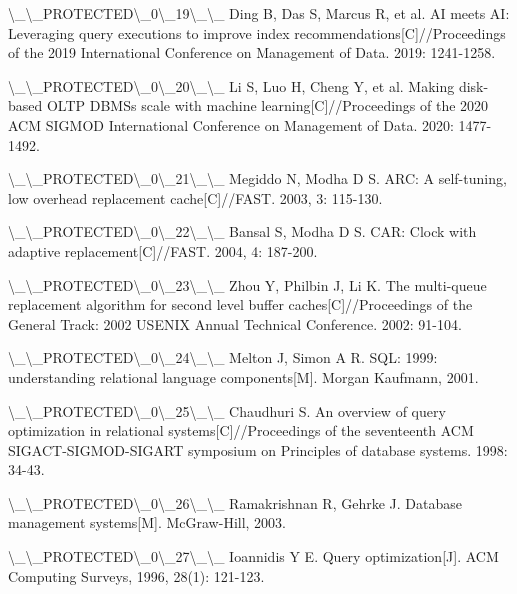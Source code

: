 \textbackslash{}_\textbackslash{}_PROTECTED\textbackslash{}_0\textbackslash{}_19\textbackslash{}_\textbackslash{}_ Ding B, Das S, Marcus R, et al. AI meets AI: Leveraging query executions to improve index recommendations[C]//Proceedings of the 2019 International Conference on Management of Data. 2019: 1241-1258.

\textbackslash{}_\textbackslash{}_PROTECTED\textbackslash{}_0\textbackslash{}_20\textbackslash{}_\textbackslash{}_ Li S, Luo H, Cheng Y, et al. Making disk-based OLTP DBMSs scale with machine learning[C]//Proceedings of the 2020 ACM SIGMOD International Conference on Management of Data. 2020: 1477-1492.

\textbackslash{}_\textbackslash{}_PROTECTED\textbackslash{}_0\textbackslash{}_21\textbackslash{}_\textbackslash{}_ Megiddo N, Modha D S. ARC: A self-tuning, low overhead replacement cache[C]//FAST. 2003, 3: 115-130.

\textbackslash{}_\textbackslash{}_PROTECTED\textbackslash{}_0\textbackslash{}_22\textbackslash{}_\textbackslash{}_ Bansal S, Modha D S. CAR: Clock with adaptive replacement[C]//FAST. 2004, 4: 187-200.

\textbackslash{}_\textbackslash{}_PROTECTED\textbackslash{}_0\textbackslash{}_23\textbackslash{}_\textbackslash{}_ Zhou Y, Philbin J, Li K. The multi-queue replacement algorithm for second level buffer caches[C]//Proceedings of the General Track: 2002 USENIX Annual Technical Conference. 2002: 91-104.

\textbackslash{}_\textbackslash{}_PROTECTED\textbackslash{}_0\textbackslash{}_24\textbackslash{}_\textbackslash{}_ Melton J, Simon A R. SQL: 1999: understanding relational language components[M]. Morgan Kaufmann, 2001.

\textbackslash{}_\textbackslash{}_PROTECTED\textbackslash{}_0\textbackslash{}_25\textbackslash{}_\textbackslash{}_ Chaudhuri S. An overview of query optimization in relational systems[C]//Proceedings of the seventeenth ACM SIGACT-SIGMOD-SIGART symposium on Principles of database systems. 1998: 34-43.

\textbackslash{}_\textbackslash{}_PROTECTED\textbackslash{}_0\textbackslash{}_26\textbackslash{}_\textbackslash{}_ Ramakrishnan R, Gehrke J. Database management systems[M]. McGraw-Hill, 2003.

\textbackslash{}_\textbackslash{}_PROTECTED\textbackslash{}_0\textbackslash{}_27\textbackslash{}_\textbackslash{}_ Ioannidis Y E. Query optimization[J]. ACM Computing Surveys, 1996, 28(1): 121-123.

